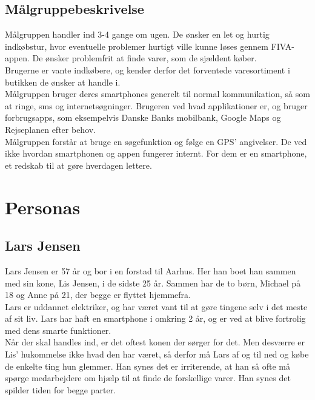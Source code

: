 \documentclass[12pt]{article}
\begin{document}
\subsection{Målgruppebeskrivelse}
Målgruppen handler ind 3-4 gange om ugen. De ønsker en let og hurtig indkøbstur, hvor eventuelle problemer hurtigt ville kunne løses gennem FIVA-appen. De ønsker problemfrit at finde varer, som de sjældent køber.\\
Brugerne er vante indkøbere, og kender derfor det forventede varesortiment i butikken de ønsker at handle i.\\

\noindent Målgruppen bruger deres smartphones generelt til normal kommunikation, så som at ringe, sms og internetsøgninger. Brugeren ved hvad applikationer er, og bruger forbrugsapps, som eksempelvis Danske Banks mobilbank, Google Maps og Rejseplanen efter behov.\\

\noindent Målgruppen forstår at bruge en søgefunktion og følge en GPS' angivelser. De ved ikke hvordan smartphonen og appen fungerer internt. For dem er en smartphone, et redskab til at gøre hverdagen lettere.

\section{Personas}

\subsection{Lars Jensen}

Lars Jensen er 57 år og bor i en forstad til Aarhus. Her han boet han sammen med sin kone, Lis Jensen, i de sidste 25 år. Sammen har de to børn, Michael på 18 og Anne på 21, der begge er flyttet hjemmefra.\\

\noindent Lars er uddannet elektriker, og har været vant til at gøre tingene selv i det meste af sit liv. Lars har haft en smartphone i omkring 2 år, og er ved at blive fortrolig med dens smarte funktioner.\\

\noindent Når der skal handles ind, er det oftest konen der sørger for det. Men desværre er Lis' hukommelse ikke hvad den har været, så derfor må Lars af og til ned og købe de enkelte ting hun glemmer. Han synes det er irriterende, at han så ofte må spørge medarbejdere om hjælp til at finde de forskellige varer. Han synes det spilder tiden for begge parter.
\end{document}
